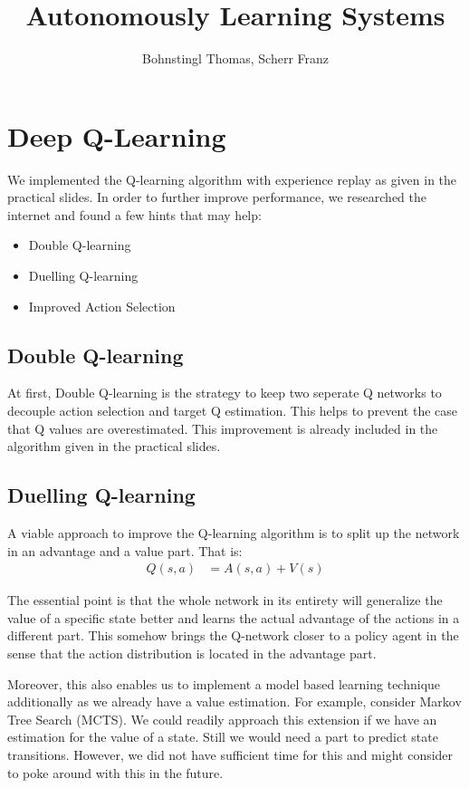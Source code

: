 \documentclass[10pt,a4paper]{article}
\author{Bohnstingl Thomas, Scherr Franz}
\title{Autonomously Learning Systems}
\begin{document}
\newcommand{\identity}{\mathbf{I}}
\newcommand{\Xmat}{\mathbf{X}}
\newcommand{\yvec}{\mathbf{y}}
\renewcommand{\th}{\theta}
\newcommand{\dthi}{\frac{\partial}{\partial \th_i}}
\newcommand{\dthj}{\frac{\partial}{\partial \th_j}}
\section{Deep Q-Learning}

We implemented the Q-learning algorithm with experience replay as given in the practical slides. In order to further improve performance, we researched the internet and found a few hints that may help:

\begin{itemize}
  \item Double Q-learning
  \item Duelling Q-learning
  \item Improved Action Selection
\end{itemize}

\subsection{Double Q-learning}
At first, Double Q-learning is the strategy to keep two seperate Q networks to decouple action selection and target Q estimation. This helps to prevent the case that Q values are overestimated. This improvement is already included in the algorithm given in the practical slides.

\subsection{Duelling Q-learning}
A viable approach to improve the Q-learning algorithm is to split up the network in an advantage and a value part. That is:
\begin{align*}
  Q(s, a) &= A(s, a) + V(s)
\end{align*}

The essential point is that the whole network in its entirety will generalize the value of a specific state better and learns the actual advantage of the actions in a different part. This somehow brings the Q-network closer to a policy agent in the sense that the action distribution is located in the advantage part.

Moreover, this also enables us to implement a model based learning technique additionally as we already have a value estimation. For example, consider Markov Tree Search (MCTS). We could readily approach this extension if we have an estimation for the value of a state. Still we would need a part to predict state transitions. However, we did not have sufficient time for this and might consider to poke around with this in the future.
\end{document}
